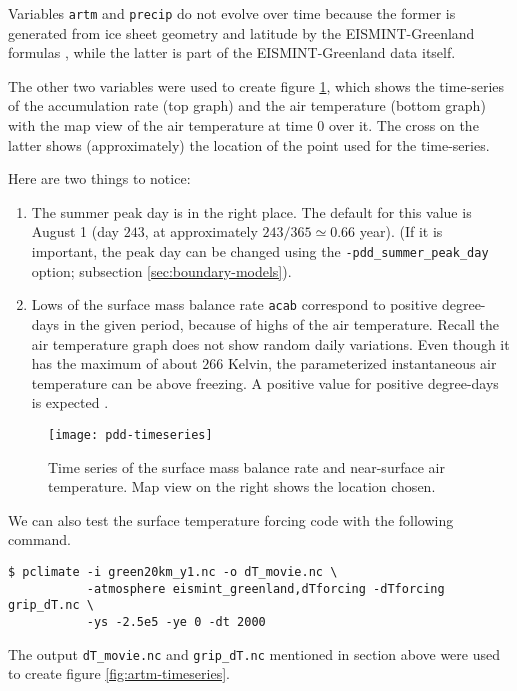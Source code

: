 Variables \texttt{artm} and \texttt{precip} do not evolve over time because the 
former is generated from ice sheet geometry and latitude by the EISMINT-Greenland
formulas \cite{RitzEISMINT}, while the latter is part of the EISMINT-Greenland data
itself.

The other two variables were used to create figure \ref{fig:pddseries}, which
shows the time-series of the accumulation rate (top graph) and the air
temperature (bottom graph) with the map view of the air temperature at time 0
over it. The cross on the latter shows (approximately) the location of the
point used for the time-series.

Here are two things to notice:
\begin{enumerate}
\item The summer peak day is in the right place.  The default for this value is
  August 1 (day $243$, at approximately $243/365 \simeq 0.66$ year).  (If it is
  important, the peak day can be changed using the \texttt{-pdd_summer_peak_day}
  option; subsection \ref{sec:boundary-models}).

\item Lows of the surface mass balance rate \texttt{acab} correspond to 
  positive degree-days in the given period, because of highs of the air
  temperature.  Recall the air temperature graph does
  not show random daily variations.  Even though it has the maximum of about $266$
  Kelvin, the parameterized instantaneous air temperature can be above freezing.
  A positive value for positive degree-days is expected \cite{CalovGreve05}.
\end{enumerate}

\begin{figure}[ht]
  \centering
  \texttt{[image: pdd-timeseries]}
  \caption{Time series of the surface mass balance rate and near-surface air temperature. Map view 
           on the right shows the location chosen.}
  \label{fig:pddseries}
\end{figure}

\bigskip
We can also test the surface temperature forcing code with the following command.
\begin{verbatim}
$ pclimate -i green20km_y1.nc -o dT_movie.nc \
           -atmosphere eismint_greenland,dTforcing -dTforcing grip_dT.nc \
           -ys -2.5e5 -ye 0 -dt 2000
\end{verbatim}%
The output \texttt{dT_movie.nc} and \texttt{grip_dT.nc} mentioned in section above were used to create figure \ref{fig:artm-timeseries}.

